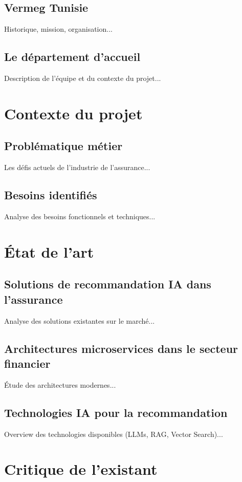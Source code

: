 \documentclass[12pt,a4paper]{report}
\begin{document}
\subsection{Vermeg Tunisie}
Historique, mission, organisation...

\subsection{Le département d'accueil}
Description de l'équipe et du contexte du projet...

\section{Contexte du projet}
\subsection{Problématique métier}
Les défis actuels de l'industrie de l'assurance...

\subsection{Besoins identifiés}
Analyse des besoins fonctionnels et techniques...

\section{État de l'art}
\subsection{Solutions de recommandation IA dans l'assurance}
Analyse des solutions existantes sur le marché...

\subsection{Architectures microservices dans le secteur financier}
Étude des architectures modernes...

\subsection{Technologies IA pour la recommandation}
Overview des technologies disponibles (LLMs, RAG, Vector Search)...

\section{Critique de l'existant}
\end{document}
